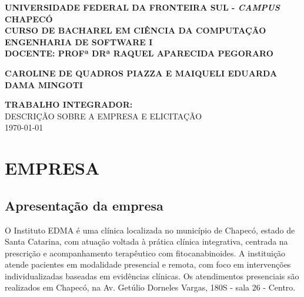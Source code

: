 \href{}{}\documentclass[12pt,portuguese,oneside]{article}
\begin{document}
\begin{center}
  \fontsize{12}{12}\selectfont\textbf{UNIVERSIDADE FEDERAL DA FRONTEIRA SUL - \textit{CAMPUS} CHAPECÓ \\
  CURSO DE BACHAREL EM CIÊNCIA DA COMPUTAÇÃO \\
  ENGENHARIA DE SOFTWARE I \\
  DOCENTE: PROFª DRª RAQUEL APARECIDA PEGORARO \\}
\end{center}

\begin{center}
  \vspace*{3cm}
  {\fontsize{12}{12}\selectfont\bfseries\uppercase{CAROLINE DE QUADROS PIAZZA E MAIQUELI EDUARDA DAMA MINGOTI}} \\
  \vspace{1cm} 
  \vfill
\end{center}

\begin{center}
  \vspace*{1cm}
  {\fontsize{12}{12}\selectfont\bfseries\uppercase{Trabalho Integrador:}} \\
  {\fontsize{12}{12}\selectfont\uppercase{Descrição sobre a empresa e Elicitação}} \\
  \vspace{8cm} 
\today
  \vfill
\end{center}


\newpage
{}
\renewcommand{\contentsname}{SUMÁRIO}
\renewcommand{\cfttoctitlefont}{\normalsize\bfseries}
\tableofcontents

\newpage

\section{EMPRESA}

\subsection{Apresentação da empresa}

\hspace{1em}O Instituto EDMA é uma clínica localizada no município de Chapecó, estado de Santa Catarina, com atuação voltada à prática clínica integrativa, centrada na prescrição e acompanhamento terapêutico com fitocanabinoides. A instituição atende pacientes em modalidade presencial e remota, com foco em intervenções individualizadas baseadas em evidências clínicas. Os atendimentos presenciais são realizados em Chapecó, na Av. Getúlio Dorneles Vargas, 180S - sala 26 - Centro.
\end{document}
